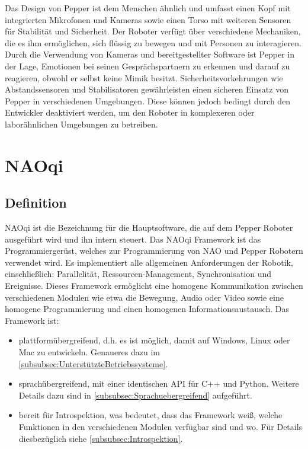 \par Das Design von Pepper ist dem Menschen ähnlich und umfasst einen Kopf mit integrierten Mikrofonen und Kameras sowie einen Torso mit weiteren Sensoren für Stabilität und Sicherheit. Der Roboter verfügt über verschiedene Mechaniken, die es ihm ermöglichen, sich flüssig zu bewegen und mit Personen zu interagieren. Durch die Verwendung von Kameras und bereitgestellter Software ist Pepper in der Lage, Emotionen bei seinen Gesprächspartnern zu erkennen und darauf zu reagieren, obwohl er selbst keine Mimik besitzt. Sicherheitsvorkehrungen wie Abstandssensoren und Stabilisatoren gewährleisten einen sicheren Einsatz von Pepper in verschiedenen Umgebungen. Diese können jedoch bedingt durch den Entwickler deaktiviert werden, um den Roboter in komplexeren oder laborähnlichen Umgebungen zu betreiben.

\section{NAOqi}
\label{sec:NAOqi}

\subsection{Definition}
\label{subsec:NAOqi}
\par NAOqi ist die Bezeichnung für die Hauptsoftware, die auf dem Pepper Roboter ausgeführt wird und ihn intern steuert. Das NAOqi Framework ist das Programmiergerüst, welches zur Programmierung von NAO und Pepper Robotern verwendet wird. Es implementiert alle allgemeinen Anforderungen der Robotik, einschließlich: Parallelität, Ressourcen-Management, Synchronisation und Ereignisse. Dieses Framework ermöglicht eine homogene Kommunikation zwischen verschiedenen Modulen wie etwa die Bewegung, Audio oder Video sowie eine homogene Programmierung und einen homogenen Informationsaustausch. Das Framework ist:
\begin{itemize}
    \item plattformübergreifend, d.h. es ist möglich, damit auf Windows, Linux oder Mac zu entwickeln. Genaueres dazu im \autoref{subsubsec:UnterstützteBetriebssysteme}.
    \item sprachübergreifend, mit einer identischen API für C++ und Python. Weitere Details dazu sind in \autoref{subsubsec:Sprachuebergreifend} aufgeführt.
    \item bereit für Introspektion, was bedeutet, dass das Framework weiß, welche Funktionen in den verschiedenen Modulen verfügbar sind und wo. Für Details diesbezüglich siehe \autoref{subsubsec:Introspektion}.
\end{itemize}

